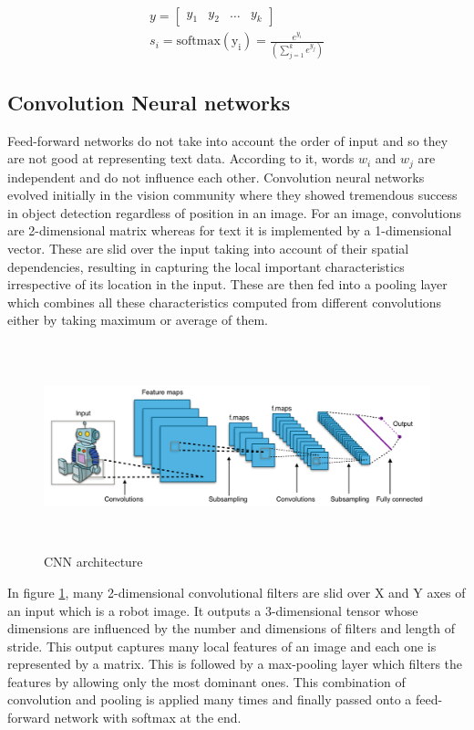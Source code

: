 \documentclass[a4paper, 11pt]{article}
\begin{document}
\begin{align*}
y = \begin{bmatrix} y_1 & y_2 & \dots & y_k \end{bmatrix} \\
s_i = \mathrm{softmax(y_i)} = \frac{e^{y_i}}{(\sum_{j=1}^ke^{y_j})}
\end{align*}

\subsection{Convolution Neural networks}

Feed-forward networks do not take into account the order of input and so they are not good at representing text data. According to it, words $w_i$ and $w_j$ are independent and do not influence each other. 
Convolution neural networks \parencite{lecun-bengio-95a}evolved initially in the vision community where they showed tremendous success in object detection regardless of position in an image. For an image, convolutions are 2-dimensional matrix whereas for text it is implemented by a 1-dimensional vector. These are slid over the input taking into account of their spatial dependencies, resulting in capturing the local important characteristics irrespective of its location in the input. These are then fed into a pooling layer which combines all these characteristics computed from different convolutions either by taking maximum or average of them.

\begin{figure}[H]
    \centering
    \includegraphics[width=\textwidth,height=6cm,keepaspectratio=true]
    {cnn-1.png}
    \caption{
        CNN architecture \parencite{cnn-1}
    }
    \label{fig:CNN architecture}
\end{figure}

In figure \ref{fig:CNN architecture}, many 2-dimensional convolutional filters are slid over X and Y axes of an input which is a robot image. It outputs a 3-dimensional tensor whose dimensions are influenced by the number and dimensions of filters and length of stride. This output captures many local features of an image and each one is represented by a matrix. This is followed by a max-pooling layer which filters the features by allowing only the most dominant ones. This combination of convolution and pooling is applied many times and finally passed onto a feed-forward network with softmax at the end. 
\end{document}
